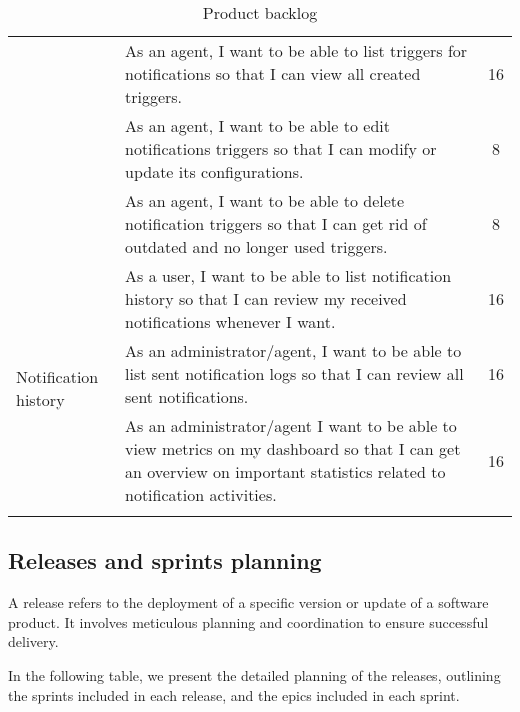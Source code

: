 \begin{longtable}{ | m{}  | m{} | c | }
        \cline{2-3}
        & As an agent, I want to be able to list triggers for notifications so that I can view all created triggers. & 16 \\
        \cline{2-3}
        & As an agent, I want to be able to edit notifications triggers so that I can modify or update its configurations. & 8 \\
        \cline{2-3}
        & As an agent, I want to be able to delete notification triggers so that I can get rid of outdated and no longer used triggers. & 8 \\
        \hline
        \multirow{4}{5em}{Notification history} & As a user, I want to be able to list notification history so that I can review my received notifications whenever I want. & 16 \\
        \cline{2-3}
        & As an administrator/agent, I want to be able to list sent notification logs so that I can review all sent notifications. & 16 \\   
        \hline
        Dashboard & As an administrator/agent I want to be able to view metrics on my dashboard so that I can get an overview on important statistics related to notification activities. & 16 \\
        \hline
        \caption{Product backlog}
\end{longtable}

\subsection{Releases and sprints planning}
A release refers to the deployment of a specific version or update of a software product. It involves meticulous planning 
and coordination to ensure successful delivery. 

In the following table, we present the detailed planning of the releases, outlining the sprints included in each release, 
and the epics included in each sprint. \\

